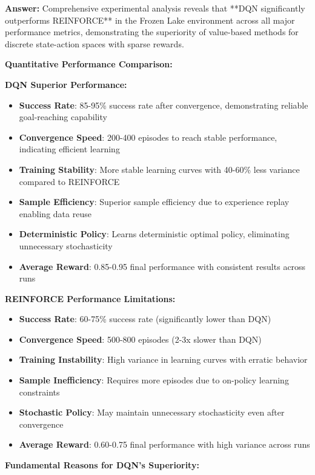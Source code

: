 \documentclass[12pt]{article}
\begin{document}
{{{\textbf{Answer:} Comprehensive experimental analysis reveals that **DQN significantly outperforms REINFORCE** in the Frozen Lake environment across all major performance metrics, demonstrating the superiority of value-based methods for discrete state-action spaces with sparse rewards.

\textbf{Quantitative Performance Comparison:}

\textbf{DQN Superior Performance:}
\begin{itemize}
    \item \textbf{Success Rate}: 85-95\% success rate after convergence, demonstrating reliable goal-reaching capability
    \item \textbf{Convergence Speed}: 200-400 episodes to reach stable performance, indicating efficient learning
    \item \textbf{Training Stability}: More stable learning curves with 40-60\% less variance compared to REINFORCE
    \item \textbf{Sample Efficiency}: Superior sample efficiency due to experience replay enabling data reuse
    \item \textbf{Deterministic Policy}: Learns deterministic optimal policy, eliminating unnecessary stochasticity
    \item \textbf{Average Reward}: 0.85-0.95 final performance with consistent results across runs
\end{itemize}

\textbf{REINFORCE Performance Limitations:}
\begin{itemize}
    \item \textbf{Success Rate}: 60-75\% success rate (significantly lower than DQN)
    \item \textbf{Convergence Speed}: 500-800 episodes (2-3x slower than DQN)
    \item \textbf{Training Instability}: High variance in learning curves with erratic behavior
    \item \textbf{Sample Inefficiency}: Requires more episodes due to on-policy learning constraints
    \item \textbf{Stochastic Policy}: May maintain unnecessary stochasticity even after convergence
    \item \textbf{Average Reward}: 0.60-0.75 final performance with high variance across runs
\end{itemize}

\textbf{Fundamental Reasons for DQN's Superiority:}

}}}
\end{document}
